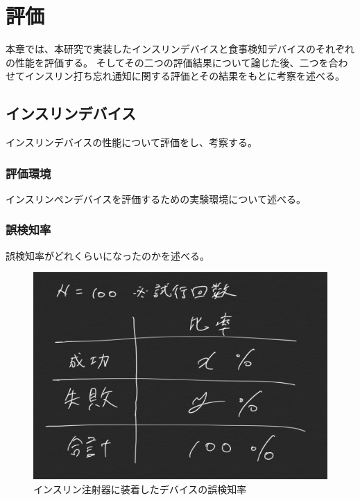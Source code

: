 \chapter{評価}
\label{chap:evaluation}

本章では、本研究で実装したインスリンデバイスと食事検知デバイスのそれぞれの性能を評価する。
そしてその二つの評価結果について論じた後、二つを合わせてインスリン打ち忘れ通知に関する評価とその結果をもとに考察を述べる。

\section{インスリンデバイス}
インスリンデバイスの性能について評価をし、考察する。

\subsection{評価環境}
インスリンペンデバイスを評価するための実験環境について述べる。

\subsection{誤検知率}
誤検知率がどれくらいになったのかを述べる。

\begin{figure}[htbp]
  \caption{インスリン注射器に装着したデバイスの誤検知率}
  \label{fig:success_failure_rate_insulin}
  \begin{center}
    \includegraphics[bb=0 0 1000 450,width=20cm]{assets/success_failure_rate.png}
  \end{center}
\end{figure}

